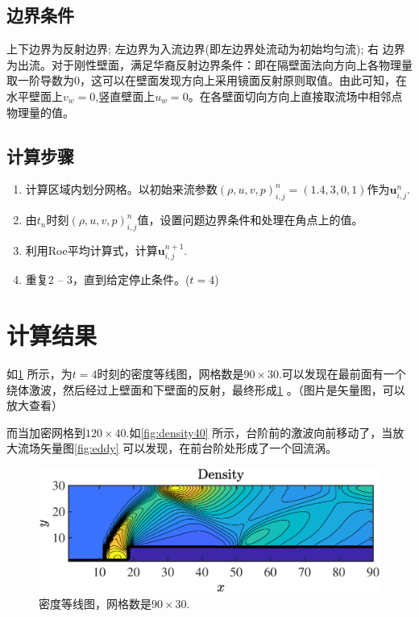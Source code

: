 \documentclass[12pt]{article}
\begin{document}
\subsection{边界条件}

上下边界为反射边界; 左边界为入流边界(即左边界处流动为初始均匀流); 右 边界为出流。对于刚性壁面，满足华裔反射边界条件：即在隔壁面法向方向上各物理量取一阶导数为0，这可以在壁面发现方向上采用镜面反射原则取值。由此可知，在水平壁面上$v_w=0$,竖直壁面上$u_w=0$。在各壁面切向方向上直接取流场中相邻点物理量的值。\cite[P339]{cfd}


\subsection{计算步骤}

\begin{enumerate}
	\item 计算区域内划分网格。以初始来流参数$(\rho,u,v,p)^n_{i,j} = (1.4,3,0,1)$作为$\bm{u}^n_{i,j}$.
	\item 由$t_n$时刻$(\rho,u,v,p)^n_{i,j}$值，设置问题边界条件和处理在角点上的值。
	\item 利用Roe平均计算式，计算$\bm{u}^{n+1}_{i,j}$.
	\item 重复2 -- 3，直到给定停止条件。($t=4$)
\end{enumerate}

\section{计算结果}

如\cref{fig:density30} 所示，为$t=4$时刻的密度等线图，网格数是$90\times 30$.可以发现在最前面有一个绕体激波，然后经过上壁面和下壁面的反射，最终形成\cref{fig:density30} 。（图片是矢量图，可以放大查看）

而当加密网格到$120\times 40$.如\cref{fig:density40} 所示，台阶前的激波向前移动了，当放大流场矢量图\cref{fig:eddy}  可以发现，在前台阶处形成了一个回流涡。





\begin{figure}[htp]
	\centering
	\includegraphics[width=14cm]{density30.eps}
	\caption{密度等线图，网格数是$90\times 30$.}
	\label{fig:density30}
\end{figure}
\end{document}
